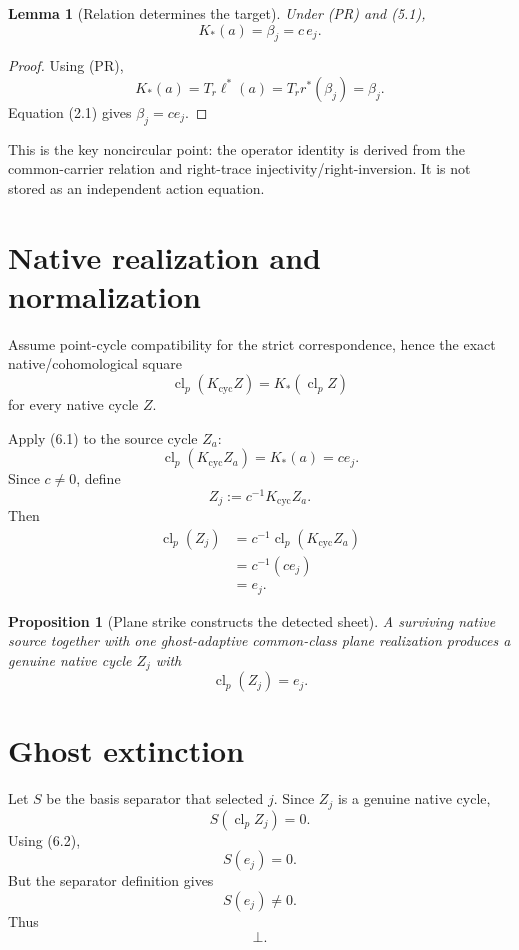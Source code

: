 \documentclass[11pt]{article}
\newtheorem{lemma}[definition]{Lemma}
\newtheorem{proposition}[definition]{Proposition}
\newcommand{\cl}{\operatorname{cl}}
\begin{document}
\begin{lemma}[Relation determines the target]
Under (PR) and (5.1),
\[
  K_*(a)=\beta_j=c\,e_j.
\]
\end{lemma}

\begin{proof}
Using (PR),
\[
  K_*(a)
  =T_r\ell^*(a)
  =T_r r^*(\beta_j)
  =\beta_j.
\]
Equation (2.1) gives $\beta_j=c e_j$.
\end{proof}

This is the key noncircular point: the operator identity is derived from the
common-carrier relation and right-trace injectivity/right-inversion.  It is not
stored as an independent action equation.

\section{Native realization and normalization}

Assume point-cycle compatibility for the strict correspondence, hence the
exact native/cohomological square
\[
  \cl_p(K_{\mathrm{cyc}}Z)=K_*(\cl_p Z) \tag{6.1}
\]
for every native cycle $Z$.

Apply (6.1) to the source cycle $Z_a$:
\[
 \cl_p(K_{\mathrm{cyc}}Z_a)
 =K_*(a)
 =c e_j.
\]
Since $c\ne0$, define
\[
  Z_j:=c^{-1}K_{\mathrm{cyc}}Z_a.
\]
Then
\[
\begin{aligned}
  \cl_p(Z_j)
  &=c^{-1}\cl_p(K_{\mathrm{cyc}}Z_a)\\
  &=c^{-1}(c e_j)\\
  &=e_j.
\end{aligned}
\tag{6.2}
\]

\begin{proposition}[Plane strike constructs the detected sheet]
A surviving native source together with one ghost-adaptive common-class plane
realization produces a genuine native cycle $Z_j$ with
\[
  \cl_p(Z_j)=e_j.
\]
\end{proposition}

\section{Ghost extinction}

Let $S$ be the basis separator that selected $j$.  Since $Z_j$ is a genuine
native cycle,
\[
  S(\cl_p Z_j)=0. \tag{7.1}
\]
Using (6.2),
\[
  S(e_j)=0. \tag{7.2}
\]
But the separator definition gives
\[
  S(e_j)\ne0. \tag{7.3}
\]
Thus
\[
  \bot.
\]
\end{document}
